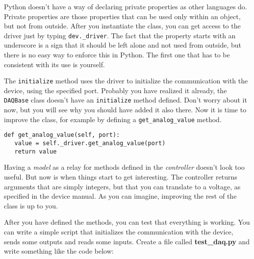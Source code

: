 Python doesn't have a way of declaring private properties as other
languages do. Private properties are those properties that can be used
only within an object, but not from outside. After you instantiate the
class, you can get access to the driver just by typing
\texttt{dev._driver}. The fact that the property starts with an
underscore is a sign that it should be left alone and not used from
outside, but there is no easy way to enforce this in Python. The first
one that has to be consistent with its use is yourself.

The \texttt{initialize} method uses the driver to initialize the
communication with the device, using the specified port. Probably you
have realized it already, the \texttt{DAQBase} class doesn't have an
\texttt{initialize} method defined. Don't worry about it now, but you
will see why you should have added it also there. Now it is time to
improve the class, for example by defining a \texttt{get_analog_value}
method.

\begin{verbatim}
def get_analog_value(self, port):
   value = self._driver.get_analog_value(port)
   return value
\end{verbatim}

Having a \emph{model} as a relay for methods defined in the
\emph{controller} doesn't look too useful. But now is when things start
to get interesting. The controller returns arguments that are simply
integers, but that you can translate to a voltage, as specified in the
device manual. As you can imagine, improving the rest of the class is up
to you.



After you have defined the methods, you can test that everything is
working. You can write a simple script that initializes the
communication with the device, sends some outputs and reads some inputs.
Create a file called \textbf{test\_daq.py} and write something like the
code below:

